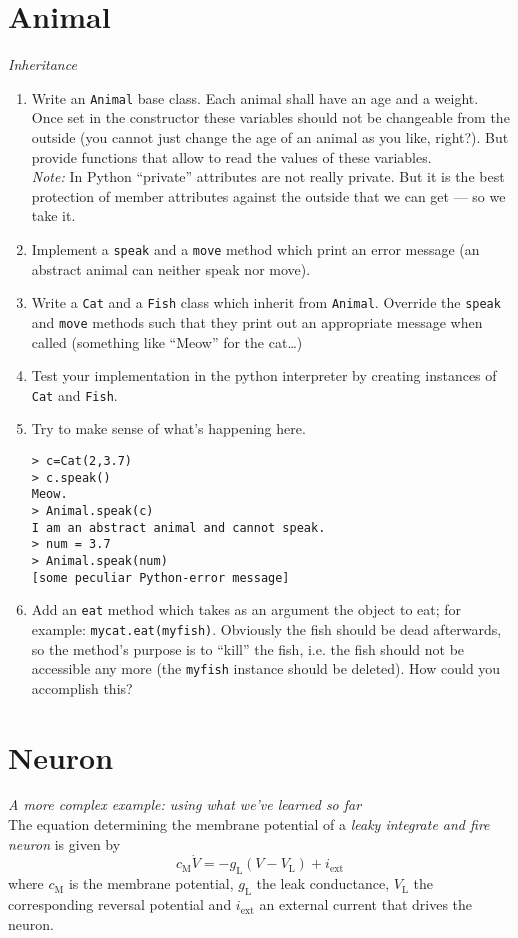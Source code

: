 \documentclass[12pt]{scrartcl}
\newcommand{\ind}[1]{_{\mathrm{#1}}}
\begin{document}
\section{Animal}
\textit{Inheritance}\\
\begin{enumerate}
\item Write an \texttt{Animal} base class. Each animal shall have an age and a weight. Once set in the constructor these variables should not be changeable from the outside (you cannot just change the age of an animal as you like, right?). But provide functions that allow to read the values of these variables.\\
\emph{Note:} In Python ``private'' attributes are not really private. But it is the best protection of member attributes against the outside that we can get --- so we take it.
\item Implement a \texttt{speak} and a \texttt{move} method which print an error message (an abstract animal can neither speak nor move).
\item Write a \texttt{Cat} and a \texttt{Fish} class which inherit from \texttt{Animal}. Override the \texttt{speak} and \texttt{move} methods such that they print out an appropriate message when called (something like ``Meow'' for the cat\dots)
\item Test your implementation in the python interpreter by creating instances of \texttt{Cat} and \texttt{Fish}.
\item Try to make sense of what's happening here.
\begin{lstlisting}
> c=Cat(2,3.7)
> c.speak()
Meow.
> Animal.speak(c)
I am an abstract animal and cannot speak.
> num = 3.7
> Animal.speak(num)
[some peculiar Python-error message]
\end{lstlisting}
\item Add an \texttt{eat} method which takes as an argument the object to eat;
  for example: \texttt{mycat.eat(myfish)}. Obviously the fish should be dead
  afterwards, so the method's purpose is to ``kill'' the fish, i.e. the fish
  should not be accessible any more (the \texttt{myfish} instance should be
  deleted). How could you accomplish this?
\end{enumerate}

\section{Neuron}
\textit{A more complex example: using what we've learned so far}\\
The equation determining the membrane potential of a \emph{leaky integrate and fire neuron} is given by 
\[c\ind{M}\dot{V}=-g\ind{L}\left(V-V\ind{L}\right)+i\ind{ext}\]
where $c\ind{M}$ is the membrane potential, $g\ind{L}$ the leak conductance, $V\ind{L}$ the corresponding reversal potential and $i\ind{ext}$ an external current that drives the neuron.
\end{document}
